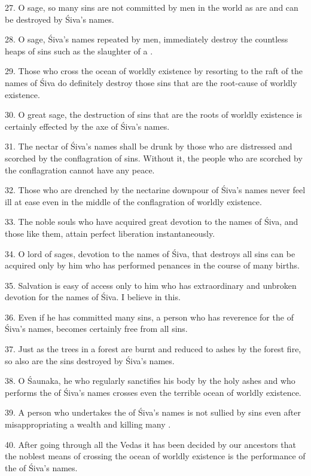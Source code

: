 27. O sage, so many sins are not committed by men in the world as are and can be
destroyed by Śiva’s names.

28. O sage, Śiva’s names repeated by men, immediately destroy the countless
heaps of sins such as the slaughter of a .

29. Those who cross the ocean of worldly existence by resorting to the raft of
the names of Śiva do definitely destroy those sins that are the root-cause of
worldly existence.

30. O great sage, the destruction of sins that are the roots of worldly
existence is certainly effected by the axe of Śiva’s names.

31. The nectar of Śiva’s names shall be drunk by those who are distressed and
scorched by the conflagration of sins. Without it, the people who are scorched
by the conflagration cannot have any peace.

32. Those who are drenched by the nectarine downpour of Śiva’s names never feel
ill at ease even in the middle of the conflagration of worldly existence.

33. The noble souls who have acquired great devotion to the names of Śiva, and
those like them, attain perfect liberation instantaneously.

34. O lord of sages, devotion to the names of Śiva, that destroys all sins can
be acquired only by him who has performed penances in the course of many births.

35. Salvation is easy of access only to him who has extraordinary and unbroken
devotion for the names of Śiva. I believe in this.

36. Even if he has committed many sins, a person who has reverence for
the  of Śiva’s names, becomes certainly free from all sins.

37. Just as the trees in a forest are burnt and reduced to ashes by the forest
fire, so also are the sins destroyed by Śiva’s names.

38. O Śaunaka, he who regularly sanctifies his body by the holy ashes and who
performs the  of Śiva’s names crosses even the terrible ocean of
worldly existence.

39. A person who undertakes the  of Śiva’s names is not sullied by sins
even after misappropriating a  wealth and killing many
.

40. After going through all the Vedas it has been decided by our ancestors that
the noblest means of crossing the ocean of worldly existence is the performance
of the  of Śiva’s names.

